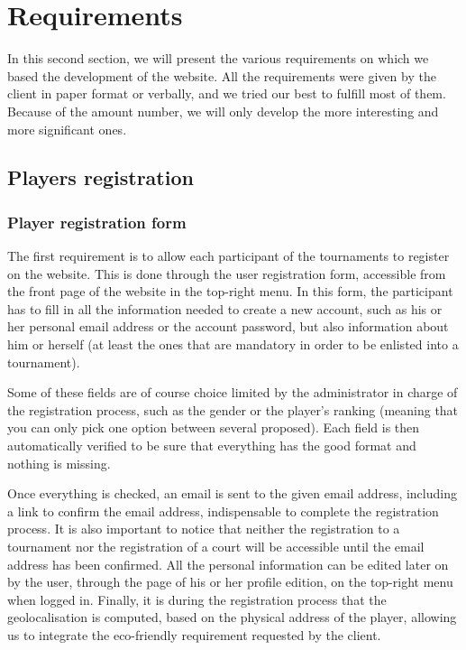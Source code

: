\section{Requirements}
\label{sec:Requirements}


In this second section, we will present the various requirements on which we
based the development of the website. All the requirements were given by the
client in paper format or verbally, and we tried our best to fulfill most of
them. Because of the amount number, we will only develop the more interesting
and more significant ones.

\subsection{Players registration}
\label{sub:Players registration}

\subsubsection{Player registration form}
\label{subs:Registration form}


The first requirement is to allow each participant of the tournaments to
register on the website. This is done through the user registration form,
accessible from the front page of the website in the top-right menu.
In this form, the participant has to fill in all the information needed to
create a new account, such as his or her personal email address or the account
password, but also information about him or herself (at least the ones that
are mandatory in order to be enlisted into a tournament).

Some of these fields are of course choice limited by the administrator in charge of the registration process, such as the gender or the player's ranking (meaning that you can only pick one option between several proposed). Each field is then automatically verified to be sure that everything has the good format and nothing is missing.

Once everything is checked, an email is sent to the given email address,
including a link to confirm the email address, indispensable to complete
the registration process. It is also important to notice that neither the
registration to a tournament nor the registration of a court will be accessible
until the email address has been confirmed. All the personal information can
be edited later on by the user, through the page of his or her profile edition,
on the top-right menu when logged in. Finally, it is during the registration
process that the geolocalisation is computed, based on the physical address
of the player, allowing us to integrate the eco-friendly requirement requested
by the client. \newline

